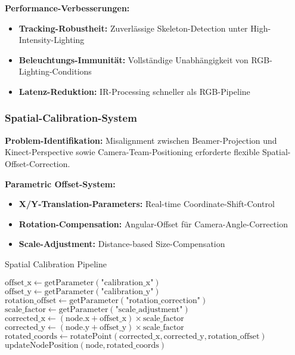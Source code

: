 \textbf{Performance-Verbesserungen:}
\begin{itemize}
    \item \textbf{Tracking-Robustheit:} Zuverlässige Skeleton-Detection unter High-Intensity-Lighting
    \item \textbf{Beleuchtungs-Immunität:} Vollständige Unabhängigkeit von RGB-Lighting-Conditions
    \item \textbf{Latenz-Reduktion:} IR-Processing schneller als RGB-Pipeline
\end{itemize}

\subsubsection{Spatial-Calibration-System}

\textbf{Problem-Identifikation:}
Misalignment zwischen Beamer-Projection und Kinect-Perspective sowie Camera-Team-Positioning erforderte flexible Spatial-Offset-Correction.

\textbf{Parametric Offset-System:}
\begin{itemize}
    \item \textbf{X/Y-Translation-Parameters:} Real-time Coordinate-Shift-Control
    \item \textbf{Rotation-Compensation:} Angular-Offset für Camera-Angle-Correction
    \item \textbf{Scale-Adjustment:} Distance-based Size-Compensation
\end{itemize}

\begin{algorithm}[H]
\caption{Spatial Calibration Pipeline}\label{alg:spatial_calibration}
\begin{algorithmic}[1]
    \State $\text{offset\_x} \leftarrow \text{getParameter}(\text{"calibration\_x"})$
    \State $\text{offset\_y} \leftarrow \text{getParameter}(\text{"calibration\_y"})$
    \State $\text{rotation\_offset} \leftarrow \text{getParameter}(\text{"rotation\_correction"})$
    \State $\text{scale\_factor} \leftarrow \text{getParameter}(\text{"scale\_adjustment"})$
        \State $\text{corrected\_x} \leftarrow (\text{node.x} + \text{offset\_x}) \times \text{scale\_factor}$
        \State $\text{corrected\_y} \leftarrow (\text{node.y} + \text{offset\_y}) \times \text{scale\_factor}$
        \State $\text{rotated\_coords} \leftarrow \text{rotatePoint}(\text{corrected\_x}, \text{corrected\_y}, \text{rotation\_offset})$
        \State $\text{updateNodePosition}(\text{node}, \text{rotated\_coords})$
    \EndFor
\end{algorithmic}
\end{algorithm}

